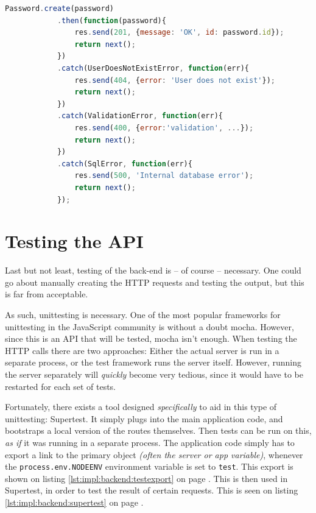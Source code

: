 		\begin{lstlisting}[language=Javascript,gobble=12,caption={Example of error handling, when creating new password},label={lst:example:errorhandle:password:create}]
            Password.create(password)
            .then(function(password){
                res.send(201, {message: 'OK', id: password.id});
                return next();
            })
            .catch(UserDoesNotExistError, function(err){
                res.send(404, {error: 'User does not exist'});
                return next();
            })
            .catch(ValidationError, function(err){
                res.send(400, {error:'validation', ...});
                return next();
            })
            .catch(SqlError, function(err){
                res.send(500, 'Internal database error');
                return next();
            });
		\end{lstlisting}

	\section{Testing the API}
		\label{sec:impl:tests}
		Last but not least, testing of the back-end is -- of course -- necessary. One could go about manually creating the HTTP requests and testing the output, but this is far from acceptable.

		As such, unittesting is necessary. One of the most popular frameworks for unittesting in the JavaScript community is without a doubt mocha. However, since this is an API that will be tested, mocha isn't enough. When testing the HTTP calls there are two approaches: Either the actual server is run in a separate process, or the test framework runs the server itself. However, running the server separately will \emph{quickly} become very tedious, since it would have to be restarted for each set of tests. 

		Fortunately, there exists a tool designed \emph{specifically} to aid in this type of unittesting: Supertest. It simply plugs into the main application code, and bootstraps a local version of the routes themselves. Then tests can be run on this, \emph{as if} it was running in a separate process. The application code simply has to export a link to the primary object \emph{(often the server or app variable)}, whenever the \verb=process.env.NODEENV= environment variable is set to \verb=test=. This export is shown on listing \ref{lst:impl:backend:testexport} on page \pageref{lst:impl:backend:testexport}. This is then used in Supertest, in order to test the result of certain requests. This is seen on listing \ref{lst:impl:backend:supertest} on page \pageref{lst:impl:backend:supertest}. 

